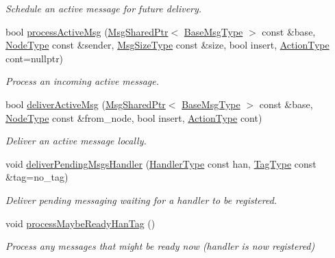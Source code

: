 \begin{DoxyCompactItemize}
\begin{DoxyCompactList}\small\item\em Schedule an active message for future delivery. \end{DoxyCompactList}\item 
bool \hyperlink{structvt_1_1messaging_1_1_active_messenger_acfbb060ad1d13a75d2a061cfde137194}{process\+Active\+Msg} (\hyperlink{structvt_1_1messaging_1_1_msg_shared_ptr}{Msg\+Shared\+Ptr}$<$ \hyperlink{namespacevt_a44d0d4e144748f2b19a1cfd962f50338}{Base\+Msg\+Type} $>$ const \&base, \hyperlink{namespacevt_a866da9d0efc19c0a1ce79e9e492f47e2}{Node\+Type} const \&sender, \hyperlink{namespacevt_a408e86a8c7c89309b52907dc5a513924}{Msg\+Size\+Type} const \&size, bool insert, \hyperlink{namespacevt_ae0a5a7b18cc99d7b732cb4d44f46b0f3}{Action\+Type} cont=nullptr)
\begin{DoxyCompactList}\small\item\em Process an incoming active message. \end{DoxyCompactList}\item 
bool \hyperlink{structvt_1_1messaging_1_1_active_messenger_ae68f0233a6d4e95d339ba6c31697dfd5}{deliver\+Active\+Msg} (\hyperlink{structvt_1_1messaging_1_1_msg_shared_ptr}{Msg\+Shared\+Ptr}$<$ \hyperlink{namespacevt_a44d0d4e144748f2b19a1cfd962f50338}{Base\+Msg\+Type} $>$ const \&base, \hyperlink{namespacevt_a866da9d0efc19c0a1ce79e9e492f47e2}{Node\+Type} const \&from\+\_\+node, bool insert, \hyperlink{namespacevt_ae0a5a7b18cc99d7b732cb4d44f46b0f3}{Action\+Type} cont)
\begin{DoxyCompactList}\small\item\em Deliver an active message locally. \end{DoxyCompactList}\item 
void \hyperlink{structvt_1_1messaging_1_1_active_messenger_a4013c1e40f1d295025fd6e0bad5e6c6d}{deliver\+Pending\+Msgs\+Handler} (\hyperlink{namespacevt_af64846b57dfcaf104da3ef6967917573}{Handler\+Type} const han, \hyperlink{namespacevt_a84ab281dae04a52a4b243d6bf62d0e52}{Tag\+Type} const \&tag=no\+\_\+tag)
\begin{DoxyCompactList}\small\item\em Deliver pending messaging waiting for a handler to be registered. \end{DoxyCompactList}\item 
void \hyperlink{structvt_1_1messaging_1_1_active_messenger_ac9fcc6ef325258985074c699b0d783c6}{process\+Maybe\+Ready\+Han\+Tag} ()
\begin{DoxyCompactList}\small\item\em Process any messages that might be ready now (handler is now registered) \end{DoxyCompactList}\item 

\end{DoxyCompactItemize}
